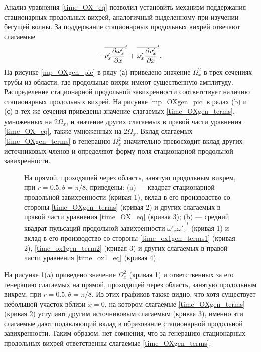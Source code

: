 Анализ уравнения \eqref{time_OX_eq} позволил установить механизм поддержания стационарных продольных вихрей, аналогичный выделенному при изучении бегущей волны. За поддержание стационарных продольных вихрей отвечают слагаемые 
\begin{equation} \label{time_OXgen_terms}
- \overline{v'_x \frac{\partial \omega'_x}{\partial x}}^t + \overline{\omega'_x \frac{\partial v'_x}{\partial x}}^t. 
\end{equation}
На рисунке \ref{mp_OXgen_pic} в ряду (а) приведено значение $\Omega_x^2$ в трех сечениях трубы из области, где продольные вихри имеют существенную амплитуду. Распределение стационарной продольной завихренности соответствует наличию стационарных продольных вихрей. На рисунке \ref{mp_OXgen_pic} в рядах (b) и (с) в тех же сечения приведены значение слагаемых \eqref{time_OXgen_terms}, умноженных на $2\Omega_x$, и значение других слагаемых в правой части уравнения \eqref{time_OX_eq}, также умноженных на $2\Omega_x$. Вклад слагаемых \eqref{time_OXgen_terms} в генерацию $\Omega_x^2$ значительно превосходит вклад других источниковых членов и определяют форму поля стационарной продольной завихренности. 

\begin{figure}[h]
\caption{На прямой, проходящей через область, занятую продольным вихрем, при $r = 0.5, \theta = \pi/8$, приведены: (a) --- квадрат стационарной продольной завихренности (кривая 1), вклад в его производство со стороны \eqref{time_OXgen_terms} (кривая  2) и других слагаемых в правой части уравнения \eqref{time_OX_eq} (кривая 3); (b) --- средний квадрат пульсаций продольной завихренности $\overline{\omega'_x \omega'_x}^t$ (кривая 1) и вклад в его производство со стороны \eqref{time_ox1gen_terms1} (кривая  2), \eqref{time_ox1gen_term2} (кривая  3) и других слагаемых в правой части уравнения \eqref{time_ox1_eq} (кривая  4).}
\label{xline_oxgen_pic}
\end{figure}

На рисунке \ref{xline_oxgen_pic}(a) приведено значение $\Omega_x^2$ (кривая 1) и ответственных за его генерацию слагаемых на прямой, проходящей через область, занятую продольным вихрем, при $r = 0.5, \theta = \pi/8$. Из этих графиков также видно, что хотя существует небольшой участок вблизи $x=0$, на котором слагаемые \eqref{time_OXgen_terms} (кривая 2) уступают другим источниковым слагаемым (кривая 3), именно эти слагаемые дают подавляющий вклад в образование стационарной продольной завихренности. Таким образом, нет сомнения, что за генерацию стационарных продольных вихрей ответственны слагаемые \eqref{time_OXgen_terms}. 

